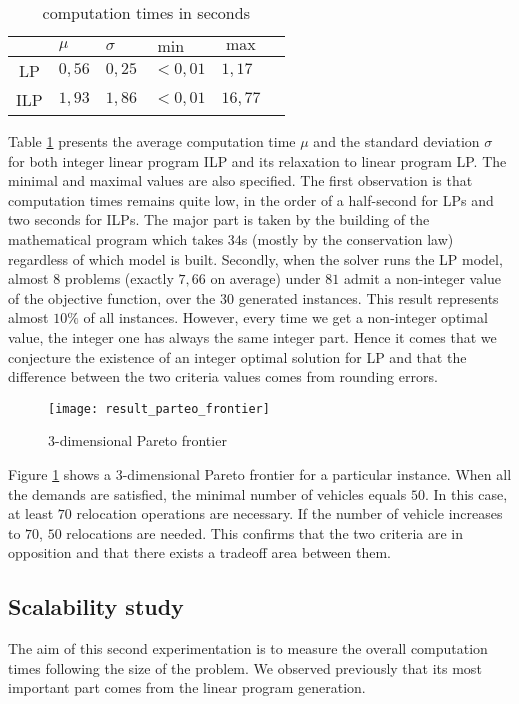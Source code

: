 \begin{bibunit}[ieeetr]
\begin{table}[t]
\renewcommand{\arraystretch}{2.3}
\caption{computation times in seconds}
\label{table_computationTimes}
\centering
\begin{tabularx}{\linewidth}{|c|*{5}{>{\centering \arraybackslash}X|}}
\cline{2-5}
\multicolumn{1}{c|}{} & $\mu$ & $\sigma$ & $\min$ & $\max$ \\
\hline
LP  & $0,56$ & $0,25$ &	$<0,01$ &  $1,17$ \\
ILP & $1,93$ & $1,86$ &	$<0,01$ & $16,77$ \\
\hline
\end{tabularx}
\end{table}

Table \ref{table_computationTimes} presents the average computation time $\mu$ and the standard deviation $\sigma$ for both integer linear program ILP and its relaxation to linear program LP. The minimal and maximal values are also specified.
The first observation is that computation times remains quite low, in the order of a half-second for LPs and two seconds for ILPs. The major part is taken by the building of the mathematical program which takes $34$s (mostly  by the conservation law) regardless of which model is built.
Secondly, when the solver runs the LP model, almost $8$ problems (exactly $7,66$ on average) under $81$ admit a non-integer value of the objective function, over the $30$ generated instances. This result represents almost $10\%$ of all instances. However, every time we get a non-integer optimal value, the integer one has always the same integer part.
Hence it comes that we conjecture the existence of an integer optimal solution for LP and that the difference between the two criteria values comes from rounding errors.

\begin{figure}[b]
\centering
\texttt{[image: result\_parteo\_frontier]}
\caption{3-dimensional Pareto frontier}
\label{fig_pareto}
\end{figure}

Figure \ref{fig_pareto} shows a 3-dimensional Pareto frontier for a particular instance. When all the demands are satisfied, the minimal number of vehicles equals $50$. In this case, at least $70$ relocation operations are necessary. If the number of vehicle increases to $70$, $50$ relocations are needed. This confirms that the two criteria are in opposition and that there exists a tradeoff area between them.


\subsection{Scalability study}
The aim of this second experimentation is to measure the overall computation times following the size of the problem. We observed previously that its most important part comes from the linear program generation.


\end{bibunit}
